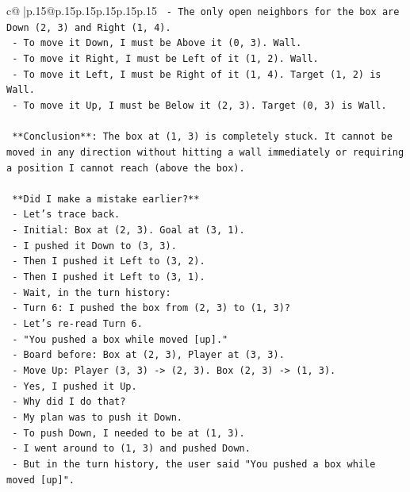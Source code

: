 \documentclass{article}
\begin{document}
{\begin{supertabular}{c@{$\;$}|p{.15\linewidth}@{}p{.15\linewidth}p{.15\linewidth}p{.15\linewidth}p{.15\linewidth}p{.15\linewidth}}
{{{\texttt{  {-} The only open neighbors for the box are Down (2, 3) and Right (1, 4).} \\
\texttt{  {-} To move it Down, I must be Above it (0, 3). Wall.} \\
\texttt{  {-} To move it Right, I must be Left of it (1, 2). Wall.} \\
\texttt{  {-} To move it Left, I must be Right of it (1, 4). Target (1, 2) is Wall.} \\
\texttt{  {-} To move it Up, I must be Below it (2, 3). Target (0, 3) is Wall.} \\
\\ 
\texttt{  **Conclusion**: The box at (1, 3) is completely stuck. It cannot be moved in any direction without hitting a wall immediately or requiring a position I cannot reach (above the box).} \\
\\ 
\texttt{  **Did I make a mistake earlier?**} \\
\texttt{  {-} Let's trace back.} \\
\texttt{  {-} Initial: Box at (2, 3). Goal at (3, 1).} \\
\texttt{  {-} I pushed it Down to (3, 3).} \\
\texttt{  {-} Then I pushed it Left to (3, 2).} \\
\texttt{  {-} Then I pushed it Left to (3, 1).} \\
\texttt{  {-} Wait, in the turn history:} \\
\texttt{    {-} Turn 6: I pushed the box from (2, 3) to (1, 3)?} \\
\texttt{    {-} Let's re{-}read Turn 6.} \\
\texttt{    {-} "You pushed a box while moved {[}up{]}."} \\
\texttt{    {-} Board before: Box at (2, 3), Player at (3, 3).} \\
\texttt{    {-} Move Up: Player (3, 3) {-}> (2, 3). Box (2, 3) {-}> (1, 3).} \\
\texttt{    {-} Yes, I pushed it Up.} \\
\texttt{    {-} Why did I do that?} \\
\texttt{    {-} My plan was to push it Down.} \\
\texttt{    {-} To push Down, I needed to be at (1, 3).} \\
\texttt{    {-} I went around to (1, 3) and pushed Down.} \\
\texttt{    {-} But in the turn history, the user said "You pushed a box while moved {[}up{]}".} \\
}}}
\end{supertabular}}
\end{document}
